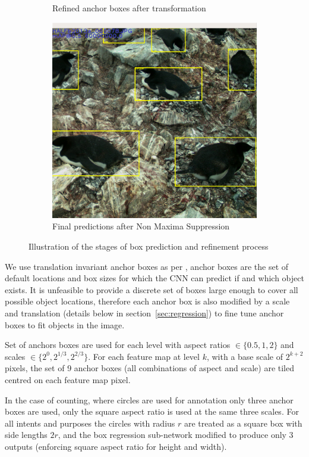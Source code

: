 \begin{figure}
\begin{subfigure}[t]{0.33\textwidth}
  \caption{Refined anchor boxes after transformation}
  \end{subfigure}%
  \begin{subfigure}[t]{0.35\textwidth}
  \includegraphics[width=0.95\linewidth]{figures/object/final.png}
  \caption{Final predictions after Non Maxima Suppression}
  \end{subfigure}%
  \caption{Illustration of the stages of box prediction and refinement process}
  \label{fig:anchor_boxes}
\end{figure}


We use translation invariant anchor boxes as per \cite{Wang2017}, anchor boxes are the set of default locations and box sizes for which the \gls{CNN} can predict if and which object exists. It is unfeasible to provide a discrete set of boxes large enough to cover all possible object locations, therefore each anchor box is also modified by a scale and translation (details below in section~\ref{sec:regression}) to fine tune anchor boxes to fit objects in the image.

Set of anchors boxes are used for each level with aspect ratios $ \in \{0.5, 1, 2\} $ and scales $ \in \{2^0, 2^{1/3}, 2^{2/3}\} $. For each feature map at level $k$, with a base scale of $ 2^{k + 2} $ pixels, the set of 9 anchor boxes (all combinations of aspect and scale) are tiled centred on each feature map pixel. 

In the case of counting, where circles are used for annotation only three anchor boxes are used, only the square aspect ratio is used at the same three scales. For all intents and purposes the circles with radius $r$ are treated as a square box with side lengths $2r$, and the box regression sub-network modified to produce only $3$ outputs (enforcing square aspect ratio for height and width).

